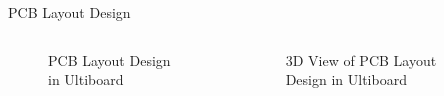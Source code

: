 \begin{frame}{PCB Layout Design}
	\begin{columns}
		\begin{figure}
			\centering
			\caption{PCB Layout Design in Ultiboard}
		\end{figure}
		\begin{figure}
			\centering
			\caption{3D View of PCB Layout Design in Ultiboard}
		\end{figure}
	\end{columns}
\end{frame}





